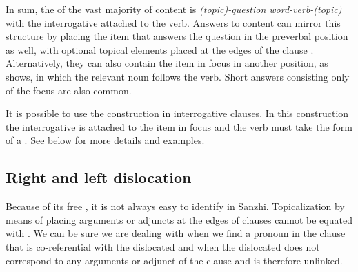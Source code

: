 In sum, the  of the vast majority of content  is \textit{(topic)-question word-verb-(topic)} with the interrogative  attached to the verb. Answers to content  can mirror this structure by placing the item that answers the question in the preverbal position as well, with optional topical elements placed at the edges of the clause . Alternatively, they can also contain the item in focus in another position, as  shows, in which the relevant noun follows the verb. Short answers consisting only of the focus are also common.

It is possible to use the  construction in interrogative clauses. In this construction the interrogative  is attached to the item in focus and the verb must take the form of a . See  below for more details and examples.



\subsection{Right and left dislocation}
\label{ssec:Right and left dislocation}

Because of its free , it is not always easy to identify  in Sanzhi. Topicalization by means of placing arguments or adjuncts at the edges of clauses cannot be equated with . We can be sure we are dealing with  when we find a pronoun in the clause that is co-referential with the dislocated  and when the dislocated  does not correspond to any arguments or adjunct of the clause and is therefore unlinked.

